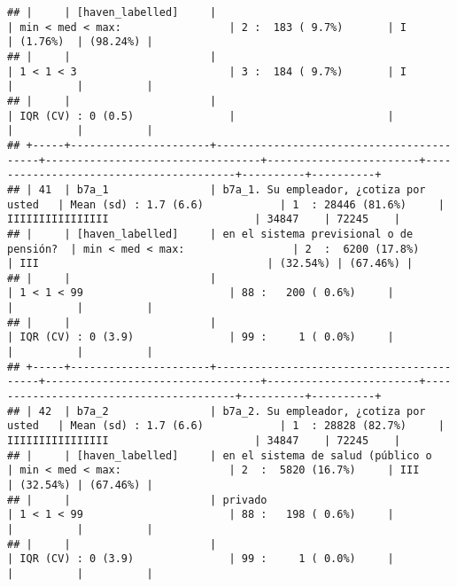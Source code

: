 \documentclass[]{article}
\begin{document}
\begin{verbatim}
## |     | [haven_labelled]     |                                          | min < med < max:                 | 2 :  183 ( 9.7%)       | I                                      | (1.76%)  | (98.24%) |
## |     |                      |                                          | 1 < 1 < 3                        | 3 :  184 ( 9.7%)       | I                                      |          |          |
## |     |                      |                                          | IQR (CV) : 0 (0.5)               |                        |                                        |          |          |
## +-----+----------------------+------------------------------------------+----------------------------------+------------------------+----------------------------------------+----------+----------+
## | 41  | b7a_1                | b7a_1. Su empleador, ¿cotiza por usted   | Mean (sd) : 1.7 (6.6)            | 1  : 28446 (81.6%)     | IIIIIIIIIIIIIIII                       | 34847    | 72245    |
## |     | [haven_labelled]     | en el sistema previsional o de pensión?  | min < med < max:                 | 2  :  6200 (17.8%)     | III                                    | (32.54%) | (67.46%) |
## |     |                      |                                          | 1 < 1 < 99                       | 88 :   200 ( 0.6%)     |                                        |          |          |
## |     |                      |                                          | IQR (CV) : 0 (3.9)               | 99 :     1 ( 0.0%)     |                                        |          |          |
## +-----+----------------------+------------------------------------------+----------------------------------+------------------------+----------------------------------------+----------+----------+
## | 42  | b7a_2                | b7a_2. Su empleador, ¿cotiza por usted   | Mean (sd) : 1.7 (6.6)            | 1  : 28828 (82.7%)     | IIIIIIIIIIIIIIII                       | 34847    | 72245    |
## |     | [haven_labelled]     | en el sistema de salud (público o        | min < med < max:                 | 2  :  5820 (16.7%)     | III                                    | (32.54%) | (67.46%) |
## |     |                      | privado                                  | 1 < 1 < 99                       | 88 :   198 ( 0.6%)     |                                        |          |          |
## |     |                      |                                          | IQR (CV) : 0 (3.9)               | 99 :     1 ( 0.0%)     |                                        |          |          |

\end{verbatim}
\end{document}

